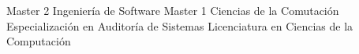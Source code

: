 
\begin{scholarship}
					{Master 2 Ingeniería de Software}
					{Master 1 Ciencias de la Comutación}
					{Especialización en Auditoría de Sistemas}
					{Licenciatura en Ciencias de la Computación}
\end{scholarship}
